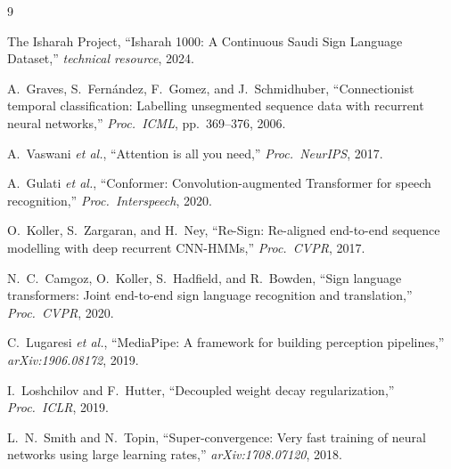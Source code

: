 \documentclass[11pt,a4paper]{article}
\begin{document}
\begin{thebibliography}{9}

The Isharah Project, ``Isharah 1000: A Continuous Saudi Sign Language Dataset,''
\emph{technical resource}, 2024.

A.~Graves, S.~Fern\'{a}ndez, F.~Gomez, and J.~Schmidhuber,
``Connectionist temporal classification: Labelling unsegmented sequence data with recurrent neural networks,''
\emph{Proc.\ ICML}, pp.~369--376, 2006.

A.~Vaswani \emph{et al.},
``Attention is all you need,''
\emph{Proc.\ NeurIPS}, 2017.

A.~Gulati \emph{et al.},
``Conformer: Convolution-augmented Transformer for speech recognition,''
\emph{Proc.\ Interspeech}, 2020.

O.~Koller, S.~Zargaran, and H.~Ney,
``Re-Sign: Re-aligned end-to-end sequence modelling with deep recurrent CNN-HMMs,''
\emph{Proc.\ CVPR}, 2017.

N.~C.~Camgoz, O.~Koller, S.~Hadfield, and R.~Bowden,
``Sign language transformers: Joint end-to-end sign language recognition and translation,''
\emph{Proc.\ CVPR}, 2020.

C.~Lugaresi \emph{et al.},
``MediaPipe: A framework for building perception pipelines,''
\emph{arXiv:1906.08172}, 2019.

I.~Loshchilov and F.~Hutter,
``Decoupled weight decay regularization,''
\emph{Proc.\ ICLR}, 2019.

L.~N.~Smith and N.~Topin,
``Super-convergence: Very fast training of neural networks using large learning rates,''
\emph{arXiv:1708.07120}, 2018.

\end{thebibliography}
\end{document}
